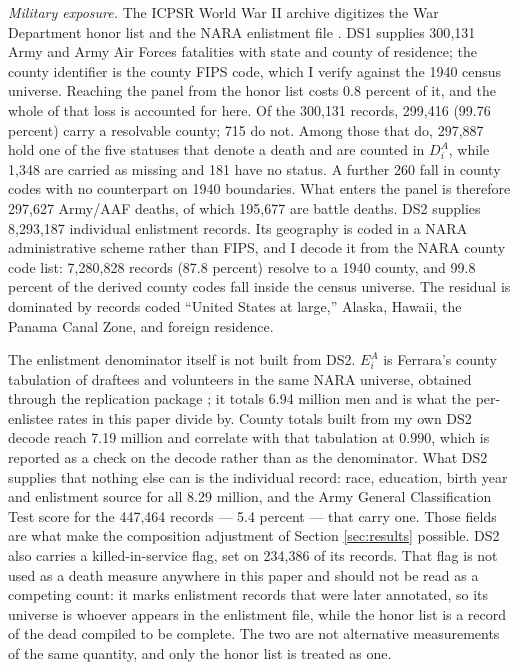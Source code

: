 \documentclass[12pt]{article}
\newcommand{\parencite}[1]{\citep{#1}}
\newcommand{\textcite}[1]{\citet{#1}}
\begin{document}
\noindent\emph{Military exposure.} The ICPSR World War II archive digitizes the
War Department honor list and the NARA enlistment file
\parencite{ferrara2024data,naraArmy1946}. DS1 supplies 300{,}131 Army and Army
Air Forces fatalities with state and county of residence; the county identifier
is the county FIPS code, which I verify against the 1940 census universe.
Reaching the panel from the honor list costs 0.8 percent of it, and the whole
of that loss is accounted for here. Of the 300{,}131 records, 299{,}416
(99.76 percent) carry a resolvable county; 715 do not. Among those that do,
297{,}887 hold one of the five statuses that denote a death and are counted in
$D_i^{A}$, while 1{,}348 are carried as missing and 181 have no status. A
further 260 fall in county codes with no counterpart on 1940 boundaries. What
enters the panel is therefore 297{,}627 Army/AAF deaths, of which 195{,}677
are battle deaths. DS2
supplies 8{,}293{,}187 individual enlistment records. Its geography is coded in
a NARA administrative scheme rather than FIPS, and I decode it from the NARA
county code list: 7{,}280{,}828 records (87.8 percent) resolve to a 1940 county,
and 99.8 percent of the derived county codes fall inside the census universe.
The residual is dominated by records coded ``United States at large,'' Alaska,
Hawaii, the Panama Canal Zone, and foreign residence.

The enlistment denominator itself is not built from DS2. $E_i^{A}$ is Ferrara's
county tabulation of draftees and volunteers in the same NARA universe, obtained
through the \textcite{garin2025} replication package \parencite{ferrara2022}; it
totals 6.94 million men and is what the per-enlistee rates in this paper divide
by. County totals built from my own DS2 decode reach 7.19 million and correlate
with that tabulation at $0.990$, which is reported as a check on the decode
rather than as the denominator. What DS2 supplies that nothing else can is the
individual record: race, education, birth year and enlistment source for all
8.29 million, and the Army General Classification Test score for the 447{,}464
records --- 5.4 percent --- that carry one. Those fields are what make the
composition adjustment of Section \ref{sec:results} possible. DS2 also carries a killed-in-service
flag, set on 234{,}386 of its records. That flag is not used as a death measure
anywhere in this paper and should not be read as a competing count: it marks
enlistment records that were later annotated, so its universe is whoever
appears in the enlistment file, while the honor list is a record of the dead
compiled to be complete. The two are not alternative measurements of the same
quantity, and only the honor list is treated as one.
\end{document}
